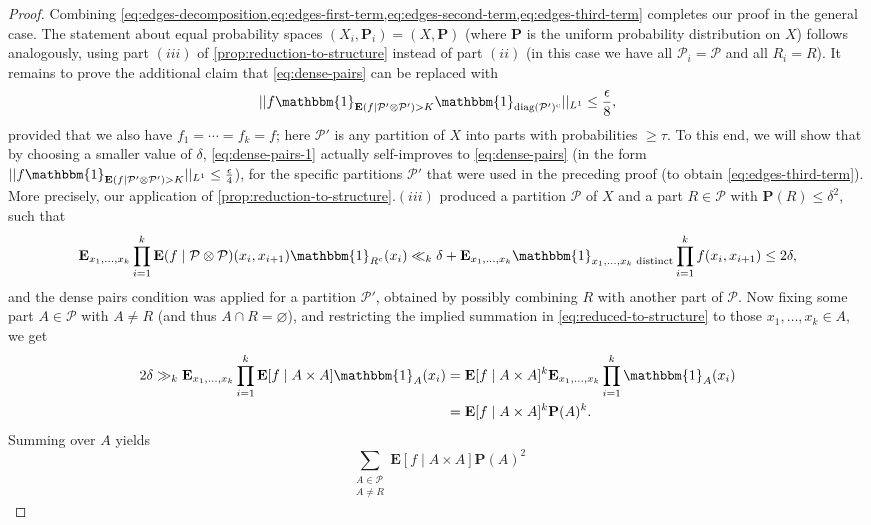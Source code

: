 \documentclass[reqno,11pt]{amsart}
\theoremstyle{definition}
\theoremstyle{remark}
\numberwithin{equation}{section}
\renewcommand{\P}{\mathbf{P}}
\newcommand{\E}{\mathbf{E}}
\newcommand{\mP}{\mathcal{P}}
\newcommand{\one}{\mathbbm{1}}
\renewcommand{\emptyset}{\varnothing}
\newcommand{\diag}{\textnormal{diag}}
\begin{document}
\begin{proof}
Combining \cref{eq:edges-decomposition,eq:edges-first-term,eq:edges-second-term,eq:edges-third-term} completes our proof in the general case. The statement about equal probability spaces $(X_i, \P_i) = (X, \P)$ (where $\P$ is the uniform probability distribution on $X$) follows analogously, using part $(iii)$ of \cref{prop:reduction-to-structure} instead of part $(ii)$ (in this case we have all $\mP_i = \mP$ and all $R_i = R$). It remains to prove the additional claim that \cref{eq:dense-pairs} can be replaced with
\begin{equation} \label{eq:dense-pairs-1}
    ||f \one_{\E(f \mid \mP' \otimes \mP') > K} \one_{\diag(\mP')^c} ||_{L^1} \le \frac{\epsilon}{8},
\end{equation}
provided that we also have $f_1 = \cdots = f_k = f$; here $\mP'$ is any partition of $X$ into parts with probabilities $\ge \tau$. To this end, we will show that by choosing a smaller value of $\delta$, \cref{eq:dense-pairs-1} actually self-improves to \cref{eq:dense-pairs} (in the form $||f \one_{\E(f \mid \mP' \otimes \mP') > K}||_{L^1} \le \frac{\epsilon}{4}$), for the specific partitions $\mP'$ that were used in the preceding proof (to obtain \cref{eq:edges-third-term}). More precisely, our application of \cref{prop:reduction-to-structure}.$(iii)$ produced a partition $\mP$ of $X$ and a part $R \in \mP$ with $\P(R) \le \delta^2$, such that
\begin{equation} \label{eq:reduced-to-structure}
    \E_{x_1, \ldots, x_k} \prod_{i=1}^k \E(f \mid \mP \otimes \mP)(x_i,x_{i+1}) \one_{R^c}(x_i) 
    \ll_k
    \delta + \E_{x_1, \ldots, x_k} \one_{x_1,\ldots,x_k \textnormal{ distinct}}\prod_{i=1}^k f(x_i,x_{i+1}) 
    \le 2\delta,
\end{equation}
and the dense pairs condition was applied for a partition $\mP'$, obtained by possibly combining $R$ with another part of $\mP$.
Now fixing some part $A \in \mP$ with $A \neq R$ (and thus $A \cap R = \emptyset$), and restricting the implied summation in \cref{eq:reduced-to-structure} to those $x_1, \ldots, x_k \in A$, we get 
\[
\begin{aligned}
    2\delta \gg_k \E_{x_1, \ldots, x_k} \prod_{i=1}^k \E[f \mid A \times A] \one_{A}(x_i) 
    &=
    \E[f \mid A \times A]^k \E_{x_1, \ldots, x_k} \prod_{i=1}^k \one_{A}(x_i)
    \\
    &= 
    \E[f \mid A \times A]^k \P(A)^k.
\end{aligned}
\]
Summing over $A$ yields
\[
    \sum_{\substack{A \in \mP \\ A \neq R}} \E[f \mid A \times A] \P(A)^2
\]
\end{proof}
\end{document}

